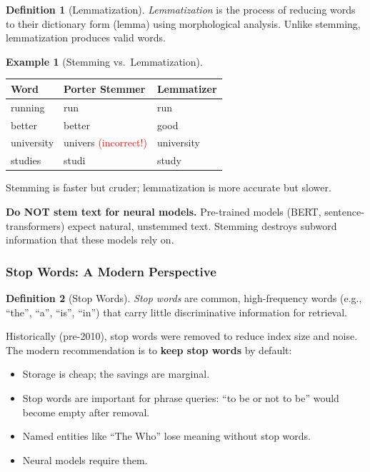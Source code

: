 \documentclass[aspectratio=169]{beamer} \usetheme{TUDelft} %
\theoremstyle{definition}
\newtheorem{definition}{Definition}[section]
\newtheorem{example}{Example}[section]
\theoremstyle{plain}
\begin{document}
\begin{definition}[Lemmatization]
\label{def:lemmatization}
\emph{Lemmatization} is the process of reducing words to their dictionary form (lemma) using morphological analysis. Unlike stemming, lemmatization produces valid words.
\end{definition}

\begin{example}[Stemming vs.\ Lemmatization]
\label{ex:stem-vs-lemma}
\begin{center}
\begin{tabular}{lll}
\toprule
\textbf{Word} & \textbf{Porter Stemmer} & \textbf{Lemmatizer} \\
\midrule
running & run & run \\
better & better & good \\
university & univers \textcolor{red}{(incorrect!)} & university \\
studies & studi & study \\
\bottomrule
\end{tabular}
\end{center}
Stemming is faster but cruder; lemmatization is more accurate but slower.
\end{example}

\begin{pitfall}
\textbf{Do NOT stem text for neural models.} Pre-trained models (BERT, sentence-transformers) expect natural, unstemmed text. Stemming destroys subword information that these models rely on.
\end{pitfall}


\subsubsection{Stop Words: A Modern Perspective}

\begin{definition}[Stop Words]
\label{def:stopwords}
\emph{Stop words} are common, high-frequency words (e.g., ``the'', ``a'', ``is'', ``in'') that carry little discriminative information for retrieval.
\end{definition}

Historically (pre-2010), stop words were removed to reduce index size and noise. The modern recommendation is to \textbf{keep stop words} by default:
\begin{itemize}
    \item Storage is cheap; the savings are marginal.
    \item Stop words are important for phrase queries: ``to be or not to be'' would become empty after removal.
    \item Named entities like ``The Who'' lose meaning without stop words.
    \item Neural models require them.
\end{itemize}
\end{document}

